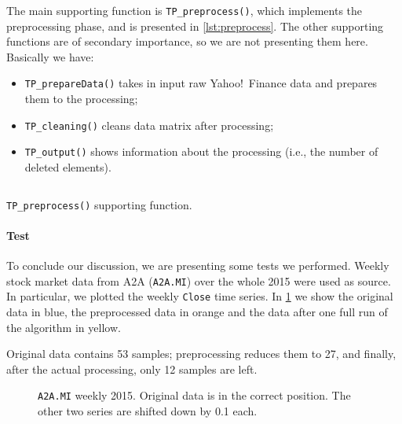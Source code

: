 \documentclass[a4paper]{article}
\begin{document}
\clearpage %

The main supporting function is \texttt{TP\_preprocess()}, which implements the preprocessing phase, and is presented in \cref{lst:preprocess}. The other supporting functions are of secondary importance, so we are not presenting them here. Basically we have: \begin{itemize}
	\item \texttt{TP\_prepareData()} takes in input raw Yahoo!\ Finance data and prepares them to the processing;
	\item \texttt{TP\_cleaning()} cleans data matrix after processing;
	\item \texttt{TP\_output()} shows information about the processing (i.e., the number of deleted elements).
\end{itemize} 

\begin{listing}%
 
\inputminted[firstline = 53, lastline = 78]{matlab}{../code/TurningPoints.m}

\caption{\texttt{TP\_preprocess()} supporting function.}\label{lst:preprocess}

\end{listing}


\paragraph{Test} To conclude our discussion, we are presenting some tests we performed. Weekly stock market data from A2A (\texttt{A2A.MI}) over the whole 2015 were used as source. In particular, we plotted the weekly \texttt{Close} time series. In \cref{fig:a2a_w_2015} we show the original data in blue, the preprocessed data in orange and the data after one full run of the algorithm in yellow. 

Original data contains 53 samples; preprocessing reduces them to 27, and finally, after the actual processing, only 12 samples are left. 

\clearpage %

\begin{figure}%
	
	
	\caption{\texttt{A2A.MI} weekly 2015. Original data is in the correct position. The other two series are shifted down by 0.1 each.}\label{fig:a2a_w_2015}

\end{figure}
\end{document}

